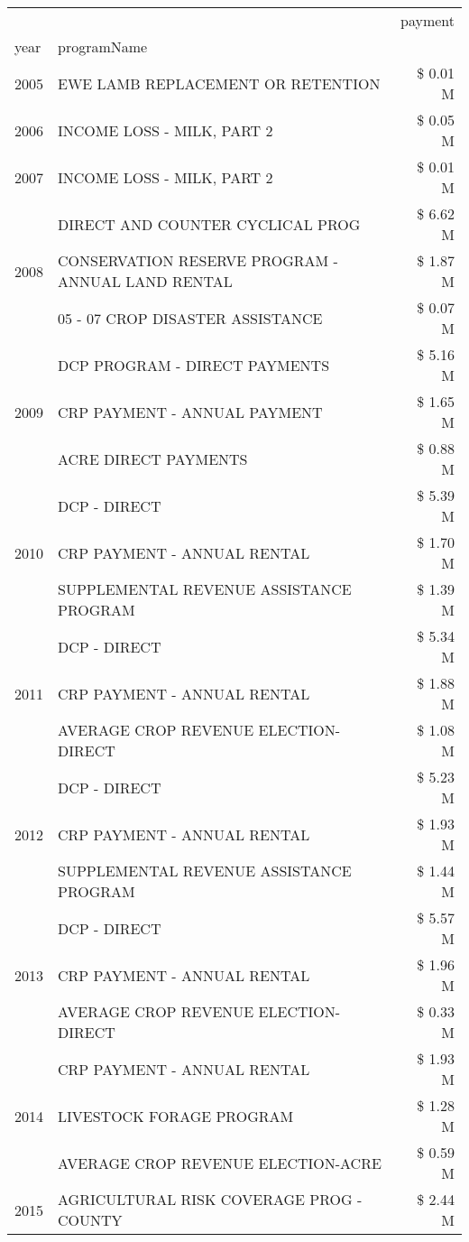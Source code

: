 \begin{tabular}{llr}
\toprule
 &  & payment \\
year & programName &  \\
\midrule
2005 & EWE LAMB REPLACEMENT OR RETENTION & \$ 0.01 M \\
\cline{1-3}
2006 & INCOME LOSS - MILK, PART 2 & \$ 0.05 M \\
\cline{1-3}
2007 & INCOME LOSS - MILK, PART 2 & \$ 0.01 M \\
\cline{1-3}
\multirow[t]{3}{*}{2008} & DIRECT AND COUNTER CYCLICAL PROG & \$ 6.62 M \\
 & CONSERVATION RESERVE PROGRAM - ANNUAL LAND RENTAL & \$ 1.87 M \\
 & 05 - 07 CROP DISASTER ASSISTANCE & \$ 0.07 M \\
\cline{1-3}
\multirow[t]{3}{*}{2009} & DCP PROGRAM - DIRECT PAYMENTS & \$ 5.16 M \\
 & CRP PAYMENT - ANNUAL PAYMENT & \$ 1.65 M \\
 & ACRE DIRECT PAYMENTS & \$ 0.88 M \\
\cline{1-3}
\multirow[t]{3}{*}{2010} & DCP - DIRECT & \$ 5.39 M \\
 & CRP PAYMENT - ANNUAL RENTAL & \$ 1.70 M \\
 & SUPPLEMENTAL REVENUE ASSISTANCE PROGRAM & \$ 1.39 M \\
\cline{1-3}
\multirow[t]{3}{*}{2011} & DCP - DIRECT & \$ 5.34 M \\
 & CRP PAYMENT - ANNUAL RENTAL & \$ 1.88 M \\
 & AVERAGE CROP REVENUE ELECTION-DIRECT & \$ 1.08 M \\
\cline{1-3}
\multirow[t]{3}{*}{2012} & DCP - DIRECT & \$ 5.23 M \\
 & CRP PAYMENT - ANNUAL RENTAL & \$ 1.93 M \\
 & SUPPLEMENTAL REVENUE ASSISTANCE PROGRAM & \$ 1.44 M \\
\cline{1-3}
\multirow[t]{3}{*}{2013} & DCP - DIRECT & \$ 5.57 M \\
 & CRP PAYMENT - ANNUAL RENTAL & \$ 1.96 M \\
 & AVERAGE CROP REVENUE ELECTION-DIRECT & \$ 0.33 M \\
\cline{1-3}
\multirow[t]{3}{*}{2014} & CRP PAYMENT - ANNUAL RENTAL & \$ 1.93 M \\
 & LIVESTOCK FORAGE PROGRAM & \$ 1.28 M \\
 & AVERAGE CROP REVENUE ELECTION-ACRE & \$ 0.59 M \\
\cline{1-3}
\multirow[t]{3}{*}{2015} & AGRICULTURAL RISK COVERAGE PROG - COUNTY & \$ 2.44 M \\

\end{tabular}

